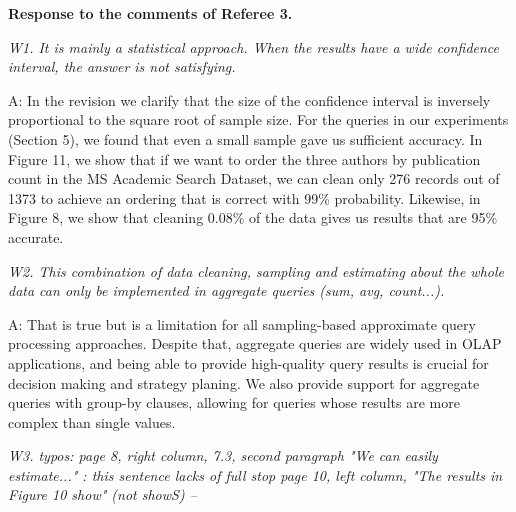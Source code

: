 


\vspace{1em}

{\noindent \bf Response to the comments of Referee 3.}

\vspace{1em}


\emph{W1. It is mainly a statistical approach. When the results have a wide confidence interval, the answer is not satisfying.}

A: 
%
%
In the revision we clarify that the size of the confidence interval is inversely proportional to the square root of sample size. 
For the queries in our experiments (Section 5), we found that even a small sample gave us sufficient accuracy. In Figure 11, we show that if we want to order the three authors by publication count in the MS Academic Search Dataset, we can clean only 276 records out of 1373 to achieve an ordering that is correct with 99\% probability. Likewise, in Figure 8, we show that cleaning 0.08\% of the data gives us results that are 95\% accurate. %

\mbox{}

\emph{W2. This combination of data cleaning, sampling and estimating about the whole data can only be implemented in aggregate queries (sum, avg, count...). }

A: That is true but is a limitation for all sampling-based approximate query processing approaches. Despite that, aggregate queries are widely used in OLAP applications, and being able to provide high-quality query results is crucial for decision making and strategy planing. We also provide support for aggregate queries with group-by clauses, allowing for queries whose results are more complex than single values.

\mbox{}


\emph{W3. typos: page 8, right column, 7.3, second paragraph "We can easily estimate..." : this sentence lacks of full stop
page 10, left column, "The results in Figure 10 show" (not showS) --}

